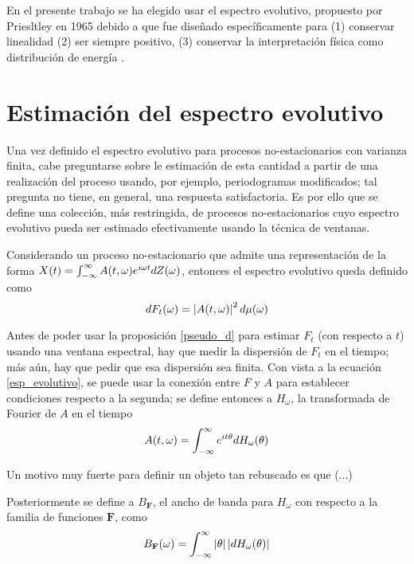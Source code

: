 En el presente trabajo se ha elegido usar el espectro evolutivo, propuesto por Priesltley en
1965 \cite{Priestley65} debido a que fue diseñado específicamente para (1) conservar linealidad 
(2) ser siempre positivo, (3) conservar la interpretación física como distribución de energía
\cite{Loynes68}.

\section{Estimación del espectro evolutivo}

Una vez definido el espectro evolutivo para procesos no-estacionarios con varianza finita, cabe 
preguntarse sobre le estimación de esta cantidad a partir de una realización del proceso usando, 
por ejemplo, periodogramas modificados; tal pregunta no tiene, en general, una respuesta 
satisfactoria.
Es por ello que se define una colección, más restringida, de procesos no-estacionarios cuyo 
espectro evolutivo pueda ser estimado efectivamente usando la técnica de ventanas.

Considerando un proceso no-estacionario \xt que admite una representación de la forma 
$X(t) = \int_{-\infty}^{\infty} A(t,\omega) e^{i \omega t} dZ(\omega)$, entonces el espectro evolutivo queda definido 
como
\begin{equation}
dF_t(\omega) = \left| A(t,\omega) \right|^{2} d\mu(\omega)
\label{esp_evolutivo}
\end{equation}

Antes de poder usar la proposición \ref{pseudo_d} para estimar $F_t$ (con respecto a $t$) usando 
una ventana espectral, hay que medir la dispersión de $F_t$ en el tiempo; más aún, hay que pedir 
que esa dispersión sea finita.
Con vista a la ecuación \ref{esp_evolutivo}, se puede usar la conexión entre $F$ y $A$ para 
establecer condiciones respecto a la segunda; se define entonces a $H_\omega$, la transformada de
Fourier de $A$ en el tiempo
\begin{equation}
A(t,\omega) = \int_{-\infty}^{\infty} e^{i t \theta} dH_\omega(\theta)
\end{equation}

Un motivo muy fuerte para definir un objeto tan rebuscado es que (...)

Posteriormente se define a $B_{\mathbf{F}}$, el ancho de banda para $H_\omega$ con respecto a la 
familia de funciones $\mathbf{F}$, como
%
\begin{equation}
B_{\mathbf{F}}(\omega) = \int_{-\infty}^{\infty} \left| \theta \right| \left| dH_\omega(\theta) \right|
\end{equation}

